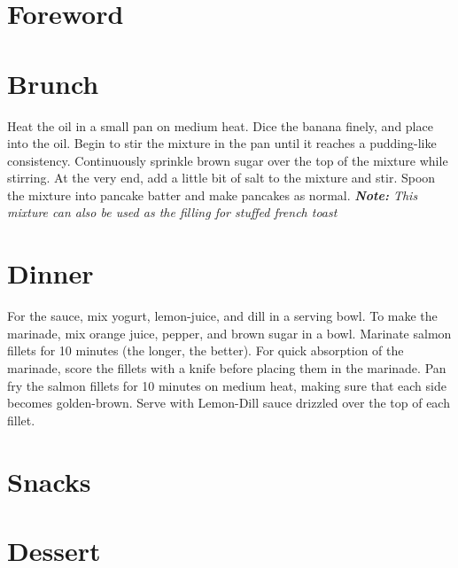 \documentclass[oneside]{recipe}
\begin{document}
\tableofcontents
\chapter{Foreword}


\chapter{Brunch}


Heat the oil in a small pan on medium heat. Dice the banana finely, and place into the oil. Begin to stir the mixture in the pan until it reaches a pudding-like consistency. 
Continuously sprinkle brown sugar over the top of the mixture while stirring. At the very end, add a little bit of salt to the mixture and stir. Spoon the mixture into pancake batter and make pancakes as normal. \textit{\textbf{Note:} This mixture can also be used as the filling for stuffed french toast}

\chapter{Dinner}

For the sauce, mix yogurt, lemon-juice, and dill in a serving bowl. 
To make the marinade, mix orange juice, pepper, and brown sugar in a bowl. Marinate salmon fillets for 10 minutes (the longer, the better). For quick absorption of the marinade, score the fillets with a knife before placing them in the marinade. 
Pan fry the salmon fillets for 10 minutes on medium heat, making sure that each side becomes golden-brown. Serve with Lemon-Dill sauce drizzled over the top of each fillet. 







\chapter{Snacks}

\chapter{Dessert}
\end{document}
